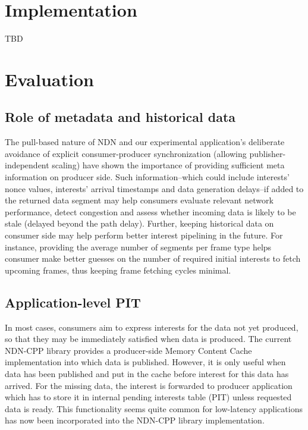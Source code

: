 \documentclass[10pt]{icn/sig-alternate-10pt} %
\begin{document}








\section{Implementation}
TBD

\section{Evaluation}
\subsection{Role of metadata and historical data}
The pull-based nature of NDN and our experimental application's deliberate avoidance of explicit consumer-producer synchronization (allowing publisher-independent scaling) have shown the importance of providing sufficient meta information on producer side. Such information--which could include interests' nonce values, interests' arrival timestamps and data generation delays--if added to the returned data segment may help consumers evaluate relevant network performance, detect congestion and assess whether incoming data is likely to be stale (delayed beyond the path delay). Further, keeping historical data on consumer side may help perform better interest pipelining in the future. For instance, providing the average number of segments per frame type helps consumer make better guesses on the number of required initial interests to fetch upcoming frames, thus keeping frame fetching cycles minimal.

\subsection{Application-level PIT}
In most cases, consumers aim to express interests for the data not yet produced, so that they may be immediately satisfied when data is produced. The current NDN-CPP library provides a producer-side Memory Content Cache implementation into which data is published. However, it is only useful when data has been published and put in the cache before interest for this data has arrived. For the missing data, the interest is forwarded to producer application which has to store it in internal pending interests table (PIT) unless requested data is ready. This functionality seems quite common for low-latency applications has now been incorporated into the NDN-CPP library implementation.
\end{document}
